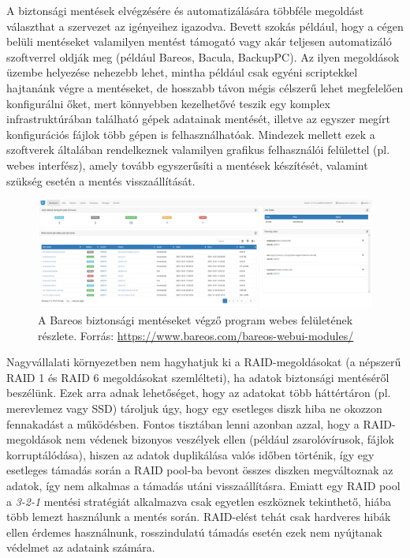 A biztonsági mentések elvégzésére és automatizálására többféle megoldást választhat a szervezet az igényeihez igazodva. Bevett szokás például, hogy a cégen belüli mentéseket valamilyen mentést támogató vagy akár teljesen automatizáló szoftverrel oldják meg (például Bareos, Bacula, BackupPC). Az ilyen megoldások üzembe helyezése nehezebb lehet, mintha például csak egyéni scriptekkel hajtanánk végre a mentéseket, de hosszabb távon mégis célszerű lehet megfelelően konfigurálni őket, mert könnyebben kezelhetővé teszik egy komplex infrastruktúrában található gépek adatainak mentését, illetve az egyszer megírt konfigurációs fájlok több gépen is felhasználhatóak. Mindezek mellett ezek a szoftverek általában rendelkeznek valamilyen grafikus felhasználói felülettel (pl. webes interfész), amely tovább egyszerűsíti a mentések készítését, valamint szükség esetén a mentés visszaállítását.

\begin{figure}[!ht]
	\centering
	\includegraphics[width=150mm, keepaspectratio]{figures/bareos-dashboard.png}
	\caption{A Bareos biztonsági mentéseket végző program webes felületének részlete. Forrás: \url{https://www.bareos.com/bareos-webui-modules/}}
	\label{fig:bareos}
\end{figure}

Nagyvállalati környezetben nem hagyhatjuk ki a RAID-megoldásokat (a népszerű RAID 1 és RAID 6 megoldásokat  szemlélteti), ha adatok biztonsági mentéséről beszélünk. Ezek arra adnak lehetőséget, hogy az adatokat több háttértáron (pl. merevlemez vagy SSD) tároljuk úgy, hogy egy esetleges diszk hiba ne okozzon fennakadást a működésben. Fontos tisztában lenni azonban azzal, hogy a RAID-megoldások nem védenek bizonyos veszélyek ellen (például zsarolóvírusok, fájlok korruptálódása), hiszen az adatok duplikálása valós időben történik, így egy esetleges támadás során a RAID pool-ba bevont összes diszken megváltoznak az adatok, így nem alkalmas a támadás utáni visszaállításra. Emiatt egy RAID pool a \textit{3-2-1} mentési stratégiát alkalmazva csak egyetlen eszköznek tekinthető, hiába több lemezt használunk a mentés során. RAID-elést tehát csak hardveres hibák ellen érdemes használnunk, rosszindulatú támadás esetén ezek nem nyújtanak védelmet az adataink számára.


